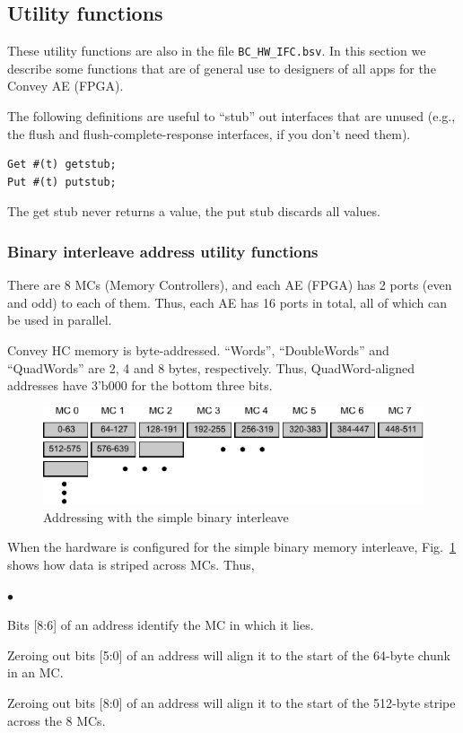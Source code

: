 \documentclass[twoside,letterpaper,11pt]{article}
\newenvironment{tightlist}%
{\begin{list}{$\bullet$}{%
    \setlength{\topsep}{0in}
    \setlength{\partopsep}{0in}
    \setlength{\itemsep}{0in}
    \setlength{\parsep}{0in}
    \setlength{\leftmargin}{1.5em}
    \setlength{\rightmargin}{0in}
    \setlength{\itemindent}{0in}
}
}%
{\end{list}
}
\begin{document}
\subsection{Utility functions}

\label{sec_utilities}

These utility functions are also in the file \verb|BC_HW_IFC.bsv|.  In
this section we describe some functions that are of general use to
designers of all apps for the Convey AE (FPGA).

The following definitions are useful to ``stub'' out interfaces that
are unused (e.g., the flush and flush-complete-response interfaces, if
you don't need them).
\begin{Verbatim}[frame=single, label=BC\_HW\_IFC.bsv] 
Get #(t) getstub;
Put #(t) putstub;
\end{Verbatim} 
The get stub never returns a value, the put stub discards all values.


\subsubsection{Binary interleave address utility functions}

\label{sec_bin_interleave}

There are 8 MCs (Memory Controllers), and each AE (FPGA) has 2 ports
(even and odd) to each of them.  Thus, each AE has 16 ports in total,
all of which can be used in parallel.

Convey HC memory is byte-addressed.  ``Words'', ``DoubleWords'' and
``QuadWords'' are 2, 4 and 8 bytes, respectively. Thus,
QuadWord-aligned addresses have 3'b000 for the bottom three bits.

\begin{figure}[htbp]
  \centerline{\includegraphics[angle=0]{Figures/Fig_bin_interleave}}
  \caption{\label{Fig_bin_interleave}Addressing with the simple binary interleave}
\end{figure}
When the hardware is configured for the simple binary memory
interleave, Fig.~\ref{Fig_bin_interleave} shows how data is
striped across MCs. Thus,
\begin{tightlist}
\item Bits [8:6] of an address identify the MC in which it lies.
\item Zeroing out bits [5:0] of an address will align it to the start
  of the 64-byte chunk in an MC.
\item Zeroing out bits [8:0] of an address will align it to the start
  of the 512-byte stripe across the 8 MCs.
\end{tightlist}
\end{document}
